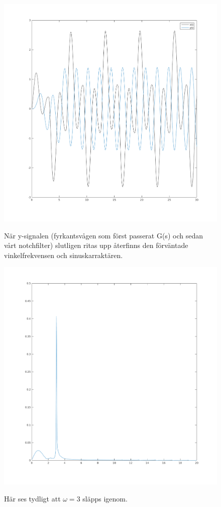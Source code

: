 \begin{figure}
    \caption{När y-signalen (fyrkantsvågen som först passerat G(s) och sedan
    vårt notchfilter) slutligen ritas upp återfinns den förväntade
    vinkelfrekvensen och sinuskarraktären.}
    \centering
    \includegraphics[scale=0.55]{figures/task4e-y-sys2.png}
    \label{fig:task4e-y-sys2}
\end{figure}

\begin{figure}
    \caption{Här ses tydligt att $\omega = 3$ släpps igenom.}
    \centering
    \includegraphics[scale=0.5]{figures/task4e-fk-x-sys2.png}
    \label{fig:task4e-fk-x-sys2}
\end{figure}

